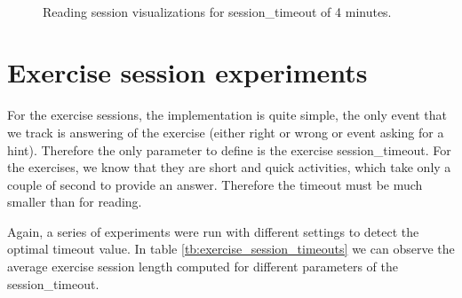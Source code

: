 \begin{figure}[bth]
	\myfloatalign
	 \quad 
	 \\
	 \quad
	\caption{Reading session visualizations for session\_timeout of 4 minutes.}\label{fig:visualizations_last_iteration}
\end{figure}

\section{Exercise session experiments}
For the exercise sessions, the implementation is quite simple, the only event that we track is answering of the exercise (either right or wrong or event asking for a hint). Therefore the only parameter to define is the exercise session\_timeout. For the exercises, we know that they are short and quick activities, which take only a couple of second to provide an answer. Therefore the timeout must be much smaller than for reading.

Again, a series of experiments were run with different settings to detect the optimal timeout value. In table \ref{tb:exercise_session_timeouts} we can observe the average exercise session length computed for different parameters of the session\_timeout.


